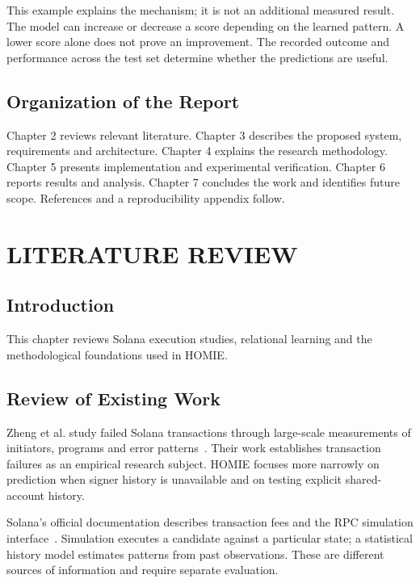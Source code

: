 \documentclass[12pt,a4paper,oneside]{report}
\begin{document}
This example explains the mechanism; it is not an additional measured result. The model can increase or decrease a score depending on the learned pattern. A lower score alone does not prove an improvement. The recorded outcome and performance across the test set determine whether the predictions are useful.

\section{Organization of the Report}
Chapter 2 reviews relevant literature. Chapter 3 describes the proposed system, requirements and architecture. Chapter 4 explains the research methodology. Chapter 5 presents implementation and experimental verification. Chapter 6 reports results and analysis. Chapter 7 concludes the work and identifies future scope. References and a reproducibility appendix follow.

\chapter{LITERATURE REVIEW}
\section{Introduction}
This chapter reviews Solana execution studies, relational learning and the methodological foundations used in HOMIE.

\section{Review of Existing Work}
Zheng et al. study failed Solana transactions through large-scale measurements of initiators, programs and error patterns~\cite{zheng}. Their work establishes transaction failures as an empirical research subject. HOMIE focuses more narrowly on prediction when signer history is unavailable and on testing explicit shared-account history.

Solana's official documentation describes transaction fees and the RPC simulation interface~\cite{fees,simulation,send}. Simulation executes a candidate against a particular state; a statistical history model estimates patterns from past observations. These are different sources of information and require separate evaluation.
\end{document}

